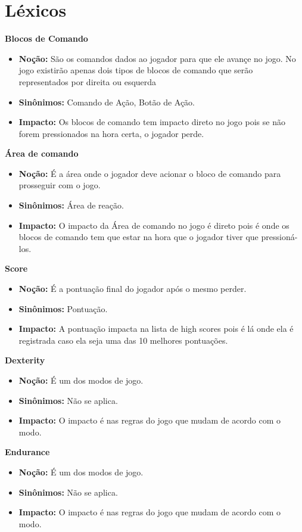 \section{Léxicos}

\textbf{Blocos de Comando}
\begin{itemize}
\item\textbf{Noção:} São os comandos dados ao jogador para que ele avançe no jogo. No jogo existirão apenas dois tipos de blocos de comando que serão representados por direita ou esquerda
\item\textbf{Sinônimos:} Comando de Ação, Botão de Ação.
\item\textbf{Impacto:} Os blocos de comando tem impacto direto no jogo pois se não forem pressionados na hora certa, o jogador perde.
\end{itemize}

\textbf{Área de comando}
\begin{itemize}
\item\textbf{Noção:} É a área onde o jogador deve acionar o bloco de comando para prosseguir com o jogo.
\item\textbf{Sinônimos:} Área de reação.
\item\textbf{Impacto:} O impacto da Área de comando no jogo é direto pois é onde os blocos de comando tem que estar na hora que o jogador tiver que pressioná-los.
\end{itemize}

\textbf{Score}
\begin{itemize}
\item\textbf{Noção:} É a pontuação final do jogador após o mesmo perder.
\item\textbf{Sinônimos:} Pontuação.
\item\textbf{Impacto:} A pontuação impacta na lista de high scores pois é lá onde ela é registrada caso ela seja uma das 10 melhores pontuações.
\end{itemize}

\textbf{Dexterity}
\begin{itemize}
\item\textbf{Noção:} É um dos modos de jogo.
\item\textbf{Sinônimos:} Não se aplica.
\item\textbf{Impacto:} O impacto é nas regras do jogo que mudam de acordo com o modo.
\end{itemize}

\textbf{Endurance}
\begin{itemize}
\item\textbf{Noção:} É um dos modos de jogo.
\item\textbf{Sinônimos:} Não se aplica.
\item\textbf{Impacto:} O impacto é nas regras do jogo que mudam de acordo com o modo.
\end{itemize}

